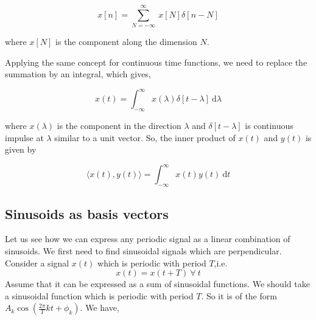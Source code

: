     	\begin{equation*}	x[n] = 	\sum_{N=-\infty}^{\infty}\ x[N]\delta[n-N]\end{equation*}
            
            where $x[N]$ is the component along the dimension $N$.
       
Applying the same concept for continuous time functions, we need to replace the summation by an integral, which gives,

					\begin{equation*}x(t) = \int_{-\infty}^{\infty} \! x(\lambda)\delta[t-\lambda] \ \mathrm{d}\lambda\end{equation*}
                    
             where $x(\lambda)$ is the component in the direction $\lambda$ and $\delta[t-\lambda]$ is continuous impulse at $\lambda$ similar to a unit vector. So, the inner product of $x(t)$ and $y(t)$ is given by
             
           \begin{equation*} \langle x(t),y(t) \rangle = \int_{-\infty}^{\infty} \! x(t)y(t) \ \mathrm{d} t\end{equation*}
             
 \subsection{Sinusoids as basis vectors}
          Let us see how we can express any periodic signal as a linear combination of sinusoids. We first need to find sinusoidal signals which are perpendicular. Consider a signal $x(t)$ which is periodic with period $T$,i.e. 
          \begin{equation*}
            x(t) = x(t+T) \ \forall \ t 
          \end{equation*}
          Assume that it can be expressed as a sum of sinusoidal functions. We should take a sinusoidal function which is periodic with period $T$. So it is of the form $A_k\cos (\frac{2\pi}{T}kt + \phi_k)$. We have,
          
